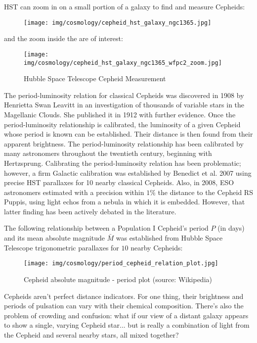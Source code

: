 	HST can zoom in on a small portion of a galaxy to find and measure Cepheids:
	\begin{figure}[H]
		\begin{center}
		\texttt{[image: img/cosmology/cepheid\_hst\_galaxy\_ngc1365.jpg]}
		\end{center}
	\end{figure}
	and the zoom inside the are of interest:
	\begin{figure}[H]
		\begin{center}
		\texttt{[image: img/cosmology/cepheid\_hst\_galaxy\_ngc1365\_wfpc2\_zoom.jpg]}
		\caption{Hubble Space Telescope Cepheid Measurement}
		\end{center}
	\end{figure}
	The period-luminosity relation for classical Cepheids was discovered in 1908 by Henrietta Swan Leavitt in an investigation of thousands of variable stars in the Magellanic Clouds. She published it in 1912 with further evidence. Once the period-luminosity relationship is calibrated, the luminosity of a given Cepheid whose period is known can be established. Their distance is then found from their apparent brightness. The period-luminosity relationship has been calibrated by many astronomers throughout the twentieth century, beginning with Hertzsprung. Calibrating the period-luminosity relation has been problematic; however, a firm Galactic calibration was established by Benedict et al. 2007 using precise HST parallaxes for 10 nearby classical Cepheids. Also, in 2008, ESO astronomers estimated with a precision within $1\%$ the distance to the Cepheid RS Puppis, using light echos from a nebula in which it is embedded. However, that latter finding has been actively debated in the literature.

	The following relationship between a Population I Cepheid's period $P$ (in days) and its mean absolute magnitude $\bar{M}$ was established from Hubble Space Telescope trigonometric parallaxes for $10$ nearby Cepheids:
	
	\begin{figure}[H]
		\begin{center}
		\texttt{[image: img/cosmology/period\_cepheid\_relation\_plot.jpg]}
		\caption{Cepheid absolute magnitude - period plot (source: Wikipedia)}
		\end{center}
	\end{figure}
	Cepheids aren't perfect distance indicators. For one thing, their brightness and periods of pulsation can vary with their chemical composition. There's also the problem of crowding and confusion: what if our view of a distant galaxy appears to show a single, varying Cepheid star... but is really a combination of light from the Cepheid and several nearby stars, all mixed together?
	
